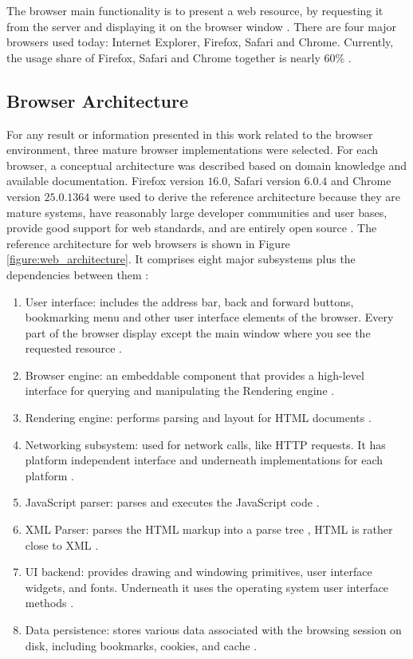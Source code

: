 The browser main functionality is to present a web resource, by requesting it from the server and displaying it on the browser window \cite{Traffic2013}. There are four major browsers used today: Internet Explorer, Firefox, Safari and Chrome. Currently, the usage share of Firefox, Safari and Chrome together is nearly 60\% \cite{Traffic2013}.


\subsection{Browser Architecture} %
\label{sub:basic_concepts:web:browser_architecture}

For any result or information presented in this work related to the browser environment, three mature browser implementations were selected. For each browser, a conceptual architecture was described based on domain knowledge and available documentation. Firefox version $16.0$, Safari version $6.0.4$ and Chrome version $25.0.1364$ were used to derive the reference architecture because they are mature systems, have reasonably large developer communities and user bases, provide good support for web standards, and are entirely open source \cite{WC2006,Grosskurth2005}. The reference architecture for web browsers is shown in Figure \ref{figure:web_architecture}. It comprises eight major subsystems plus the dependencies between them \cite{Grosskurth2005}:

\begin{enumerate}
  \item User interface: includes the address bar, back and forward buttons, bookmarking menu and other user interface elements of the browser. Every part of the browser display except the main window where you see the requested resource \cite{Grosskurth2005}.
  \item Browser engine: an embeddable component that provides a high-level interface for querying and manipulating the Rendering engine \cite{Grosskurth2005,Rocks2013}.
  \item Rendering engine: performs parsing and layout for HTML documents \cite{Grosskurth2005,Rocks2013}.
  \item Networking subsystem: used for network calls, like HTTP requests. It has platform independent interface and underneath implementations for each platform \cite{Grosskurth2005,Rocks2013}.
  \item JavaScript parser: parses and executes the JavaScript \cite{International2009} code \cite{Grosskurth2005}.
  \item XML Parser: parses the HTML markup into a parse tree \cite{Hickson2013}, HTML is rather close to XML \cite{Rocks2013,Hickson2013}.
  \item UI backend: provides drawing and windowing primitives, user interface widgets, and fonts. Underneath it uses the operating system user interface methods \cite{Grosskurth2005}.
  \item Data persistence: stores various data associated with the browsing session on disk, including bookmarks, cookies, and cache \cite{Grosskurth2005,Rocks2013}.
\end{enumerate}

